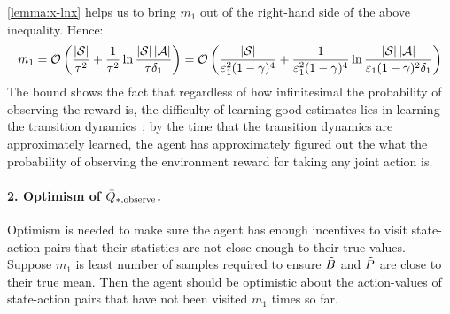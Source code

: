 \cref{lemma:x-lnx} helps us to bring $m_1$ out of the right-hand side of the above inequality. Hence:
%
\begin{equation*}
    m_1 = \mathcal{O} \left(\frac{\left \lvert \mathcal{S} \right \rvert}{\tau^2} + \frac{1}{\tau^2}\ln{\frac{\left \lvert \mathcal{S} \right \rvert\left \lvert \mathcal{A} \right \rvert}{\tau\delta_1}} \right) = \mathcal{O} \left(\frac{|\mathcal{S}|}{\varepsilon_1^2(1 - \gamma)^4} + \frac{1}{\varepsilon_1^2(1 - \gamma)^4} \ln{\frac{\left \lvert \mathcal{S} \right \rvert\left \lvert \mathcal{A} \right \rvert}{\varepsilon_1(1 - \gamma)^2\delta_1}}\right)
\end{equation*}
The bound shows the fact that regardless of how infinitesimal the probability of observing the reward is, the difficulty of learning good estimates lies in learning the transition dynamics~\citep{kakade2003sample, szitamormax}; by the time that the transition dynamics are approximately learned, the agent has approximately figured out the what the probability of observing the environment reward for taking any joint action is.
%
\paragraph{2. Optimism of $\bar{Q}_{*, \text{observe}}$.}

Optimism is needed to make sure the agent has enough incentives to visit state-action pairs that their statistics are not close enough to their true values. Suppose $m_1$ is least number of samples required to ensure $\tilde{B}$ and $\tilde{P}$ are close to their true mean. Then the agent should be optimistic about the action-values of state-action pairs that have not been visited $m_1$ times so far.

